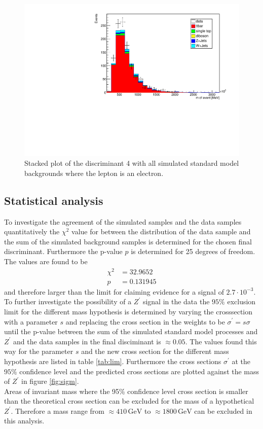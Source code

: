 \begin{figure}[tb]
  \centering
  \includegraphics[width=.6\textwidth]{plots/comparism/m_event.pdf}
  \caption{Stacked plot of the discriminant 4 with all simulated standard model backgrounds where the lepton 
  is an electron.}
  \label{fig:7}
\end{figure}


\subsection{Statistical analysis}
To investigate the agreement of the simulated samples and the data samples quantitatively the $\chi^2$ value for between the distribution of the 
data sample and the sum of the simulated background samples is determined for the chosen final discriminant. Furthermore the p-value $p$ is 
determined for 25 degrees of freedom. 
The values are found to be 
\begin{align*}
  \chi^2 &= 32.9652 \\
  p &= 0.131945
\end{align*}
and therefore larger than the limit for claiming evidence for a signal of $2.7 \cdot 10^{-3}$. 
To further investigate the possibility of a $Z^\prime$ signal in the data the $95 \%$ exclusion limit for the different mass hypothesis 
is determined by varying the crosssection with a parameter $s$ and replacing the cross section in the weights to be $\sigma^\prime = s \sigma$ 
until the p-value between the sum of the simulated standard model processes and $Z^\prime$ and the data samples in the final disciminant is 
$\approx 0.05$. The values found this way for the parameter $s$ and the new cross section for the different mass hypothesis are listed in table \ref{tab:lim}. 
Furthermore the cross sections $\sigma^\prime$ at the $95 \%$ confidence level and the predicted cross sections are plotted against the mass of $Z^\prime$ 
in figure \ref{fig:sigm}.\\
Areas of invariant mass where the 95\% confidence level cross section is smaller than the theoretical cross section can be excluded for the mass of 
a hypothetical $Z^\prime$. Therefore a mass range from $\approx 410 \, \si{\giga\eV}$ to $\approx 1800 \, \si{\giga\eV}$ can be excluded in this analysis. 

